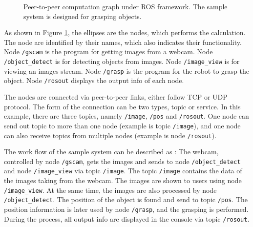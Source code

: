 \documentclass[a4paper, 10pt, conference]{ieeeconf}       %
\begin{document}
\begin{figure}[htpb]
  \centering
  \caption{Peer-to-peer computation graph under ROS framework. The sample system is designed for grasping objects.}
  \label{fig:framework}
\end{figure}

As shown in Figure \ref{fig:framework}, the ellipses are the nodes, which performs the calculation. The node are identified by their names, which also indicates their functionality. Node \texttt{/gscam} is the program for getting images from a webcam. Node \texttt{/object\_detect} is for detecting objects from images. Node \texttt{/image\_view} is for viewing an images stream. Node \texttt{/grasp} is the program for the robot to grasp the object. Node \texttt{/rosout} displays the output info of each node.

The nodes are connected via peer-to-peer links, either follow TCP or UDP protocol. The form of the connection can be two types, topic or service. In this example, there are three topics, namely \texttt{/image}, \texttt{/pos} and \texttt{/rosout}. One node can send out topic to more than one node (example is topic \texttt{/image}), and one node can also receive topics from multiple nodes (example is node \texttt{/rosout}). 

The work flow of the sample system can be described as : The webcam, controlled by node \texttt{/gscam}, gets the images and sends to node \texttt{/object\_detect} and node \texttt{/image\_view} via topic \texttt{/image}. The topic \texttt{/image} contains the data of the images taking from the webcam. The images are shown to users using node \texttt{/image\_view}. At the same time, the images are also processed by node \texttt{/object\_detect}. The position of the object is found and send to topic \texttt{/pos}. The position information is later used by node \texttt{/grasp}, and the grasping is performed. During the process, all output info are displayed in the console via topic \texttt{/rosout}.
\end{document}
